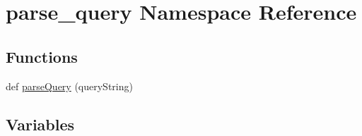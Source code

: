 \hypertarget{namespaceparse__query}{}\section{parse\+\_\+query Namespace Reference}
\label{namespaceparse__query}
\subsection*{Functions}
\begin{DoxyCompactItemize}
\item 
def \hyperlink{namespaceparse__query_a0771a3827bbf0ed432115ce95bcfc828}{parse\+Query} (query\+String)
\end{DoxyCompactItemize}
\subsection*{Variables}
